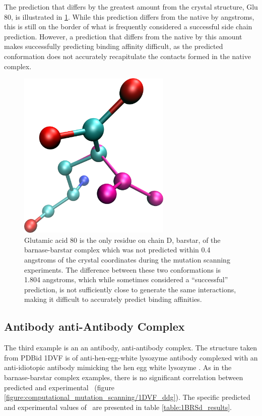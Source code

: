 The prediction that differs by the greatest amount from the crystal structure, Glu 80, is illustrated in \ref{figure:computational_mutation_scanning/1brs_d_80}.
While this prediction differs from the native by  angstroms, this is still on the border of what is frequently considered a successful side chain prediction.
However, a prediction that differs from the native by this amount makes successfully predicting binding affinity difficult, as the predicted conformation does not accurately recapitulate the contacts formed in the native complex.
\begin{figure}[h]
    \centering
    \includegraphics[width=0.65\textwidth,height=0.3\textheight,keepaspectratio]{figures/mutation_side_chain_images/1brs_chain_d_80.png}
    \caption{Glutamic acid 80 is the only residue on chain D, barstar, of the barnase-barstar complex which was not predicted within 0.4 angstroms of the crystal coordinates during the mutation scanning experiments.
    The difference between these two conformations is 1.804 angstroms, which while sometimes considered a ``successful'' prediction, is not sufficiently close to generate the same interactions, making it difficult to accurately predict binding affinities.}
    \label{figure:computational_mutation_scanning/1brs_d_80}
\end{figure}

\FloatBarrier
\subsection{Antibody anti-Antibody Complex}
The third example is an an antibody, anti-antibody complex.
The structure taken from PDBid 1DVF is of anti-hen-egg-white lysozyme antibody complexed with an anti-idiotopic antibody mimicking the hen egg white lysozyme \cite{braden1996crystal}.
As in the barnase-barstar complex examples, there is no significant correlation between predicted and experimental \ddg\ (figure \ref{figure:computational_mutation_scanning/1DVF_ddg}).
The specific predicted and experimental values of \ddg\ are presented in table \ref{table:1BRSd_results}.

